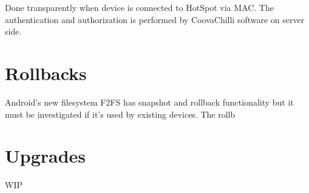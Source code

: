 \documentclass[a4paper, sans, booktabs, totpages, english]{report}
\begin{document}
Done transparently when device is connected to HotSpot via MAC. The
authentication and authorization is performed by CoovaChilli software
on server side.


\section{Rollbacks}

Android's new filesystem F2FS has snapshot and rollback functionality
but it must be investigated if it's used by existing devices. The
rollb


\section{Upgrades}

WIP
\end{document}

